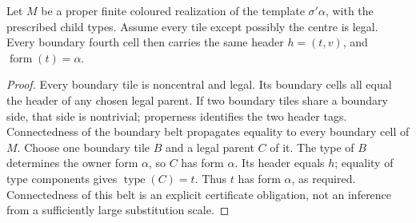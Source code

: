 \begin{lemma}
\label{lem:comp/boundary-header}
Let $M$ be a proper finite coloured realization of the template $\sigma'\alpha$,
with the prescribed child types. Assume every tile except possibly the
centre is legal. Every boundary fourth cell then carries the same header
$h=(t,v)$, and $\operatorname{form}(t)=\alpha$.
\end{lemma}
\begin{proof}
Every boundary tile is noncentral and legal. Its boundary cells all equal
the header of any chosen legal parent. If two boundary tiles share a boundary
side, that side is nontrivial; properness identifies the two header tags.
Connectedness of the boundary belt propagates equality to every boundary
cell of $M$. Choose one boundary tile $B$ and a legal parent $C$ of it.
The type of $B$ determines the owner form $\alpha$, so $C$ has form $\alpha$.
Its header equals $h$; equality of type components gives $\operatorname{type}(C)=t$.
Thus $t$ has form $\alpha$, as required. Connectedness of this belt is an
explicit certificate obligation, not an inference from a sufficiently
large substitution scale.
\end{proof}

